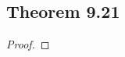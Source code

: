 \documentclass[../../main.tex]{subfiles}
\begin{document}
\subsection{Theorem 9.21}
\begin{wts}

\end{wts}
\begin{proof}

\end{proof}
\end{document}
